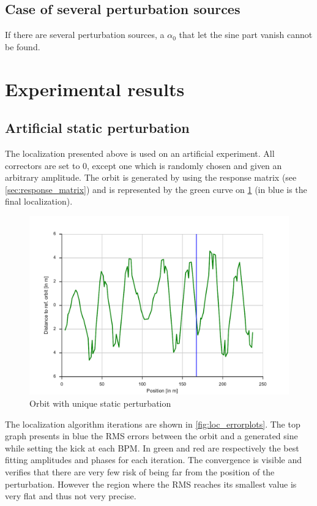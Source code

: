 \subsection{Case of several perturbation sources}
If there are several perturbation sources, a $\alpha_0$ that let the sine part vanish cannot be found.

\section{Experimental results}
\subsection{Artificial static perturbation}
The localization presented above is used on an artificial experiment. All correctors are set to 0, except one which is randomly chosen and given an arbitrary amplitude. The orbit is generated by using the response matrix (see \cref{sec:response_matrix}) and is represented by the green curve on \cref{fig:loc_orbit} (in blue is the final localization).

\begin{figure}
    \centering
    \includegraphics[width=\linewidth]{img/loc_orbit}
    \caption{\label{fig:loc_orbit} Orbit with unique static perturbation}
\end{figure}

The localization algorithm iterations are shown in \cref{fig:loc_errorplots}. The top graph presents in blue the RMS errors between the orbit and a generated sine while setting the kick at each BPM. In green and red are respectively the best fitting amplitudes and phases for each iteration. The convergence is visible and verifies that there are very few risk of being far from the position of the perturbation. However the region where the RMS reaches its smallest value is very flat and thus not very precise.

